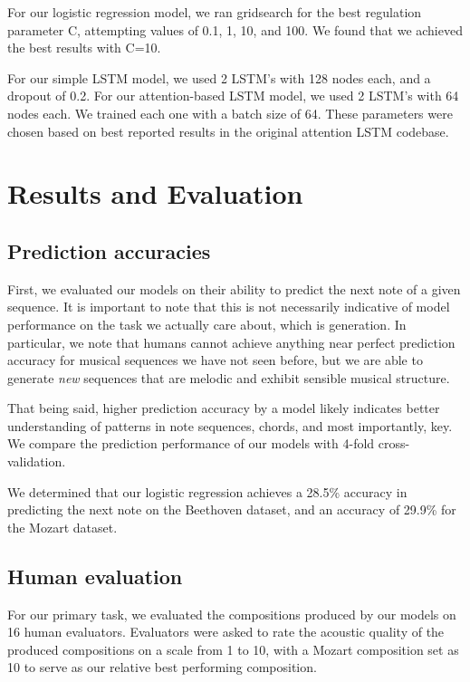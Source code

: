 \documentclass[twoside,twocolumn]{article}
\begin{document}
For our logistic regression model, we ran gridsearch for the best regulation parameter C, attempting values of 0.1, 1, 10, and 100. We found that we achieved the best results with C=10.

For our simple LSTM model, we used 2 LSTM's with 128 nodes each, and a dropout of 0.2. For our attention-based LSTM model, we used 2 LSTM's with 64 nodes each. We trained each one with a batch size of 64. These parameters were chosen based on best reported results in the original attention LSTM codebase.



\section{Results and Evaluation}

\subsection{Prediction accuracies}
First, we evaluated our models on their ability to predict the next note of a given sequence. It is important to note that this is not necessarily indicative of model performance on the task we actually care about, which is generation. In particular, we note that humans cannot achieve anything near perfect prediction accuracy for musical sequences we have not seen before, but we are able to generate \textit{new} sequences that are melodic and exhibit sensible musical structure.

That being said, higher prediction accuracy by a model likely indicates better understanding of patterns in note sequences, chords, and most importantly, key. We compare the prediction performance of our models with 4-fold cross-validation.

We determined that our logistic regression achieves a 28.5\% accuracy  in predicting the next note on the Beethoven dataset, and an accuracy of 29.9\% for the Mozart dataset. \\

\subsection{Human evaluation}
For our primary task, we evaluated the compositions produced by our models on 16 human
evaluators. Evaluators were asked to rate the acoustic quality of the produced
compositions on a scale from 1 to 10, with a Mozart composition set as 10 to
serve as our relative best performing composition.
\end{document}
